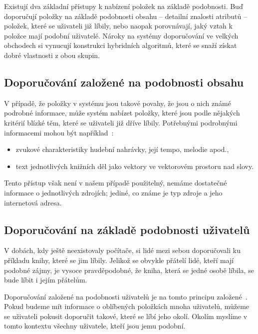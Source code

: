 Existují dva základní přístupy k nabízení položek na základě podobnosti.
Buď doporučují položky na základě podobnosti obsahu -- detailní znalosti atributů -- položek, které se uživateli již líbily,
nebo naopak porovnávají, jaký vztah k položce mají podobní uživatelé.
Nároky na systémy doporučování ve velkých obchodech si vynucují konstrukci hybridních algoritmů, které se snaží získat dobré vlastnosti z obou skupin.

\subsection{Doporučování založené na podobnosti obsahu}

V případě, že položky v systému jsou takové povahy, že jsou o nich známé podrobné informace, může systém nabízet položky, které jsou podle nějakých kritérií blízké těm, které se uživateli již dříve líbily.
Potřebnými podrobnými informacemi mohou být například~\cite{pazzani2007content}:
\begin{itemize}
    \item zvukové charakteristiky hudební nahrávky, její tempo, melodie apod.,
    \item text jednotlivých knižních děl jako vektory ve vektorovém prostoru nad slovy.
\end{itemize}

Tento přístup však není v našem případě použitelný, nemáme dostatečné informace o jednotlivých zdrojích; jediné, co známe je typ zdroje a jeho internetová adresa.

\subsection{Doporučování na základě podobnosti uživatelů}

V dobách, kdy ještě neexistovaly počítače, si lidé mezi sebou doporučovali ku příkladu knihy, které se jim líbily.
Jelikož se obvykle přátelí lidé, kteří mají podobné zájmy, je vysoce pravděpodobné, že kniha, která se jedné osobě líbila, se bude líbit i jejím přátelům.

Doporučování založené na podobnosti uživatelů je na tomto principu založené~\cite{schafer2007collaborative}.
Pokud budeme mít informace o oblíbených položkách mnoha uživatelů, můžeme se uživateli pokusit doporučit takové, které se líbí jeho okolí.
Okolím myslíme v tomto kontextu všechny uživatele, kteří jsou jemu podobní.

